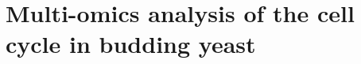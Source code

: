 \documentclass[]{article}
\begin{document}
\section{Multi-omics analysis of the cell cycle in budding yeast} \label{sec:yeast}




\end{document}
